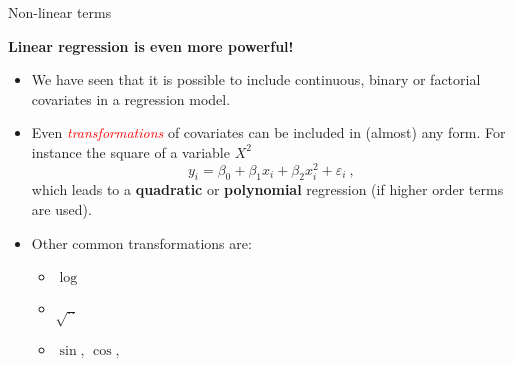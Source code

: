 \documentclass[10pt,ignorenonframetext,]{beamer}
\providecommand{\tightlist}{%
  \setlength{\itemsep}{0pt}\setlength{\parskip}{0pt}}
\begin{document}
\begin{frame}

\begin{block}{Non-linear terms}

\vspace{2mm}

\textbf{Linear regression is even more powerful!} \vspace{2mm}

\begin{itemize}
\tightlist
\item
  We have seen that it is possible to include continuous, binary or
  factorial covariates in a regression model.
\end{itemize}

\vspace{2mm}

\begin{itemize}
\tightlist
\item
  Even \emph{\textcolor{red}{transformations}} of covariates can be
  included in (almost) any form. For instance the square of a variable
  \(X^2\) \begin{equation*}
  y_i = \beta_0 + \beta_1 x_i + \beta_2 x_i^2 + \varepsilon_i \ , 
  \end{equation*} which leads to a \textbf{quadratic} or
  \textbf{polynomial} regression (if higher order terms are used).
\end{itemize}

\vspace{4mm}

\begin{itemize}
\tightlist
\item
  Other common transformations are:

  \begin{itemize}
  \tightlist
  \item
    \(\log\)
  \item
    \(\sqrt{..}\)
  \item
    \(\sin\), \(\cos\),
  \end{itemize}
\end{itemize}

\end{block}

\end{frame}
\end{document}
